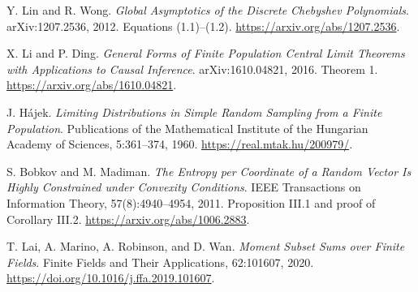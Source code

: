  Y. Lin and R. Wong.
\emph{Global Asymptotics of the Discrete Chebyshev Polynomials}.
arXiv:1207.2536, 2012. Equations (1.1)--(1.2).
\url{https://arxiv.org/abs/1207.2536}.

 X. Li and P. Ding.
\emph{General Forms of Finite Population Central Limit Theorems
with Applications to Causal Inference}.
arXiv:1610.04821, 2016. Theorem 1.
\url{https://arxiv.org/abs/1610.04821}.

 J. H\'ajek.
\emph{Limiting Distributions in Simple Random Sampling from a Finite Population}.
Publications of the Mathematical Institute of the Hungarian Academy of Sciences,
5:361--374, 1960.
\url{https://real.mtak.hu/200979/}.

 S. Bobkov and M. Madiman.
\emph{The Entropy per Coordinate of a Random Vector Is Highly
Constrained under Convexity Conditions}.
IEEE Transactions on Information Theory, 57(8):4940--4954, 2011.
Proposition III.1 and proof of Corollary III.2.
\url{https://arxiv.org/abs/1006.2883}.

 T. Lai, A. Marino, A. Robinson, and D. Wan.
\emph{Moment Subset Sums over Finite Fields}.
Finite Fields and Their Applications, 62:101607, 2020.
\url{https://doi.org/10.1016/j.ffa.2019.101607}.
